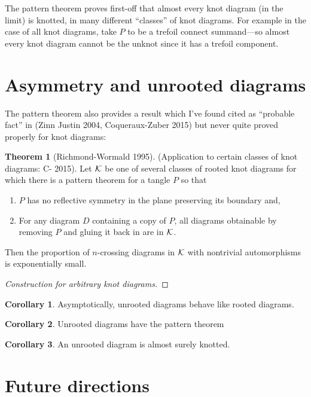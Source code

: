 \documentclass[12pt]{amsart}
\theoremstyle{definition}
\newtheorem*{theorem}{Theorem}
\newtheorem*{corollary}{Corollary}
\theoremstyle{plain}
\begin{document}
The pattern theorem proves first-off that almost every knot diagram (in the
limit) is knotted, in many different ``classes'' of knot diagrams. For
example in the case of all knot diagrams, take $P$ to be a trefoil
connect summand---so almost every knot diagram cannot be the unknot
since it has a trefoil component.

\section{Asymmetry and unrooted diagrams}

The pattern theorem also provides a result which I've found cited as
``probable fact'' in (Zinn Justin 2004, Coqueraux-Zuber 2015) but
never quite proved properly for knot diagrams:

\begin{theorem}[Richmond-Wormald 1995] (Application to certain classes
  of knot diagrams: C- 2015). Let $\mathcal{K}$ be one of several
  classes of rooted knot diagrams for which there is a pattern theorem
  for a tangle $P$ so that
  \begin{enumerate}
  \item $P$ has no reflective symmetry in the plane preserving its
    boundary and,
  \item For any diagram $D$ containing a copy of $P$, all diagrams
    obtainable by removing $P$ and gluing it back in are in
    $\mathcal{K}$.
  \end{enumerate}
  Then the proportion of $n$-crossing diagrams in $\mathcal{K}$ with nontrivial
  automorphisms is exponentially small.
\end{theorem}
\begin{proof}[Construction for arbitrary knot diagrams]
  \vspace{1in}

\end{proof}
\begin{corollary}
  Asymptotically, unrooted diagrams behave like rooted diagrams.
\end{corollary}
\begin{corollary}
  Unrooted diagrams have the pattern theorem
\end{corollary}
\begin{corollary}
  An unrooted diagram is almost surely knotted.
\end{corollary}

\section{Future directions}
\end{document}
